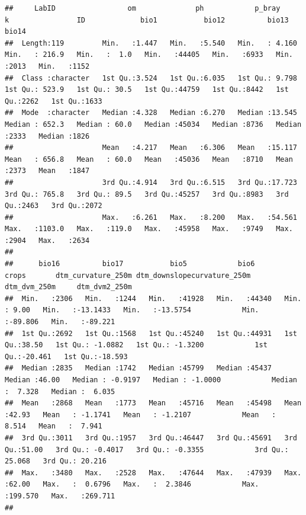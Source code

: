 \documentclass[
  10pt,
  b5paper,
  oneside]{book}
\begin{document}
\begin{verbatim}
##     LabID                 om              ph            p_bray             k                ID             bio1           bio12          bio13          bio14     
##  Length:119         Min.   :1.447   Min.   :5.540   Min.   : 4.160   Min.   : 216.9   Min.   :  1.0   Min.   :44405   Min.   :6933   Min.   :2013   Min.   :1152  
##  Class :character   1st Qu.:3.524   1st Qu.:6.035   1st Qu.: 9.798   1st Qu.: 523.9   1st Qu.: 30.5   1st Qu.:44759   1st Qu.:8442   1st Qu.:2262   1st Qu.:1633  
##  Mode  :character   Median :4.328   Median :6.270   Median :13.545   Median : 652.3   Median : 60.0   Median :45034   Median :8736   Median :2333   Median :1826  
##                     Mean   :4.217   Mean   :6.306   Mean   :15.117   Mean   : 656.8   Mean   : 60.0   Mean   :45036   Mean   :8710   Mean   :2373   Mean   :1847  
##                     3rd Qu.:4.914   3rd Qu.:6.515   3rd Qu.:17.723   3rd Qu.: 765.8   3rd Qu.: 89.5   3rd Qu.:45257   3rd Qu.:8983   3rd Qu.:2463   3rd Qu.:2072  
##                     Max.   :6.261   Max.   :8.200   Max.   :54.561   Max.   :1103.0   Max.   :119.0   Max.   :45958   Max.   :9749   Max.   :2904   Max.   :2634  
##                                                                                                                                                                   
##      bio16          bio17           bio5            bio6           crops       dtm_curvature_250m dtm_downslopecurvature_250m  dtm_dvm_250m     dtm_dvm2_250m    
##  Min.   :2306   Min.   :1244   Min.   :41928   Min.   :44340   Min.   : 9.00   Min.   :-13.1433   Min.   :-13.5754            Min.   :-89.806   Min.   :-89.221  
##  1st Qu.:2692   1st Qu.:1568   1st Qu.:45240   1st Qu.:44931   1st Qu.:38.50   1st Qu.: -1.0882   1st Qu.: -1.3200            1st Qu.:-20.461   1st Qu.:-18.593  
##  Median :2835   Median :1742   Median :45799   Median :45437   Median :46.00   Median : -0.9197   Median : -1.0000            Median :  7.328   Median :  6.035  
##  Mean   :2868   Mean   :1773   Mean   :45716   Mean   :45498   Mean   :42.93   Mean   : -1.1741   Mean   : -1.2107            Mean   :  8.514   Mean   :  7.941  
##  3rd Qu.:3011   3rd Qu.:1957   3rd Qu.:46447   3rd Qu.:45691   3rd Qu.:51.00   3rd Qu.: -0.4017   3rd Qu.: -0.3355            3rd Qu.: 25.068   3rd Qu.: 20.216  
##  Max.   :3480   Max.   :2528   Max.   :47644   Max.   :47939   Max.   :62.00   Max.   :  0.6796   Max.   :  2.3846            Max.   :199.570   Max.   :269.711  
##                                                                                                                                                                  

\end{verbatim}
\end{document}
